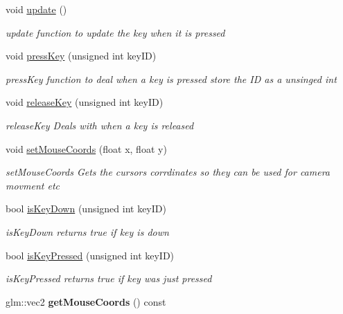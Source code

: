 \begin{DoxyCompactItemize}
\item 
\hypertarget{classRandini_1_1InputControl_a8b03756c114cefa983dce5a97b18138d}{
void \hyperlink{classRandini_1_1InputControl_a8b03756c114cefa983dce5a97b18138d}{update} ()}
\label{classRandini_1_1InputControl_a8b03756c114cefa983dce5a97b18138d}

\begin{DoxyCompactList}\small\item\em update function to update the key when it is pressed \item\end{DoxyCompactList}\item 
void \hyperlink{classRandini_1_1InputControl_a1b1b8d717a70da6874a047d6a83f90df}{pressKey} (unsigned int keyID)
\begin{DoxyCompactList}\small\item\em pressKey function to deal when a key is pressed store the ID as a unsinged int \item\end{DoxyCompactList}\item 
void \hyperlink{classRandini_1_1InputControl_a64352005e174fb38a18cdee3874a3f2b}{releaseKey} (unsigned int keyID)
\begin{DoxyCompactList}\small\item\em releaseKey Deals with when a key is released \item\end{DoxyCompactList}\item 
void \hyperlink{classRandini_1_1InputControl_a7d59848ed252cba960ed66528460e4e3}{setMouseCoords} (float x, float y)
\begin{DoxyCompactList}\small\item\em setMouseCoords Gets the cursors corrdinates so they can be used for camera movment etc \item\end{DoxyCompactList}\item 
bool \hyperlink{classRandini_1_1InputControl_a7afd081b388ab767e5f453af0f944af8}{isKeyDown} (unsigned int keyID)
\begin{DoxyCompactList}\small\item\em isKeyDown returns true if key is down \item\end{DoxyCompactList}\item 
bool \hyperlink{classRandini_1_1InputControl_a1cfe9f5f3d3e551add411776af91ce6f}{isKeyPressed} (unsigned int keyID)
\begin{DoxyCompactList}\small\item\em isKeyPressed returns true if key was just pressed \item\end{DoxyCompactList}\item 
\hypertarget{classRandini_1_1InputControl_a0af97c3a0dd5b89cf344867279695a59}{
glm::vec2 {\bfseries getMouseCoords} () const }
\label{classRandini_1_1InputControl_a0af97c3a0dd5b89cf344867279695a59}

\end{DoxyCompactItemize}


